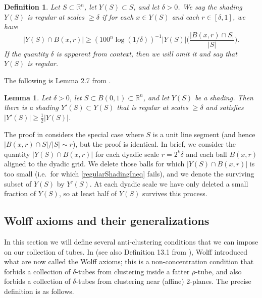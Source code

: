 \documentclass[letterpaper, reqno,11pt]{article}
\numberwithin{equation}{section}
\newcommand{\RR}{\mathbb{R}}
\numberwithin{thm}{section}
\newtheorem{defn}[thm]{Definition}
\newtheorem{lem}[thm]{Lemma}
\theoremstyle{remark}
\begin{document}
\begin{defn}\label{regularShading}
Let $S\subset\RR^n$, let $Y(S)\subset S$, and let $\delta>0$. We say the shading $Y(S)$ is \emph{regular} at scales $\geq\delta$ if for each $x\in Y(S)$ and each $r\in[\delta, 1]$, we have
\begin{equation}\label{regularShadingIneq}
|Y(S)\cap B(x,r)| \geq (100^n\log(1/\delta))^{-1} |Y(S)|\Big(\frac{|B(x,r)\cap S|}{|S|}\Big).
\end{equation}
If the quantity $\delta$ is apparent from context, then we will omit it and say that $Y(S)$ is regular. 
\end{defn}
The following is Lemma 2.7 from \cite{KWZ}. 
\begin{lem}\label{findRegularShading}
Let $\delta>0$, let $S\subset B(0,1)\subset \RR^n$, and let $Y(S)$ be a shading. Then there is a shading $Y'(S)\subset Y(S)$ that is regular at scales $\geq\delta$ and satisfies $|Y'(S)|\geq\frac{1}{2}|Y(S)|$. 
\end{lem}
The proof in \cite{KWZ} considers the special case where $S$ is a unit line segment (and hence $|B(x,r)\cap S|/|S|\sim r$), but the proof is identical. In brief, we consider the quantity $|Y(S)\cap B(x,r)|$ for each dyadic scale $r=2^k\delta$ and each ball $B(x,r)$ aligned to the dyadic grid. We delete those balls for which $|Y(S)\cap B(x,r)|$ is too small (i.e.~for which \eqref{regularShadingIneq} fails), and we denote the surviving subset of $Y(S)$ by $Y'(S)$. At each dyadic scale we have only deleted a small fraction of $Y(S)$, so at least half of $Y(S)$ survives this process. 




\subsection{Wolff axioms and their generalizations}\label{wolffAxiomsSection}
In this section we will define several anti-clustering conditions that we can impose on our collection of tubes. In \cite{Wolff95} (see also Definition 13.1 from \cite{KLT}), Wolff introduced what are now called the Wolff axioms; this is a non-concentration condition that forbids a collection of $\delta$-tubes from clustering inside a fatter $\rho$-tube, and also forbids a collection of $\delta$-tubes from clustering near (affine) 2-planes. The precise definition is as follows.
\end{document}
